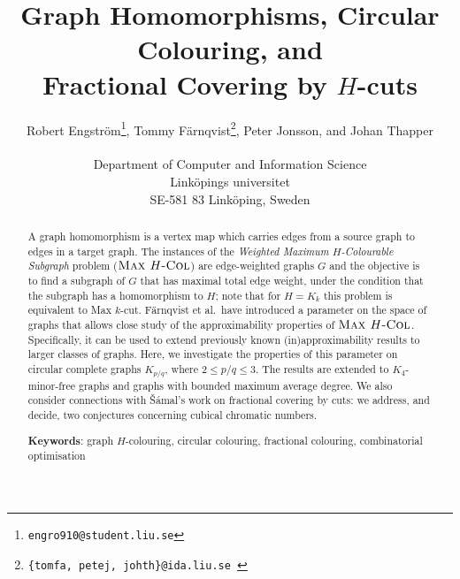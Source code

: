 \documentclass[11pt,a4paper]{article}
\begin{document}
\newcommand{\props}{{\it props}}
\newcommand{\rels}{{\it rels}}
\newcommand{\deduce}{\vdash_p}

\newcommand{\pform}{{\rm Pr}}
\newcommand{\axform}{{\rm AX}}
\newcommand{\axset}{{\bf AX}}
\newcommand{\resdeduce}{\vdash_{\rm R}}
\newcommand{\resaxdeduce}{\vdash_{\rm R,A}}

\newcommand{\cmis}{{\em \#mis}}
\newcommand{\combine}{{\em comb}}

\newcommand{\xcsp}{{\sc X-Csp}}
\newcommand{\csp}{{\sc Csp}}

\newcommand{\cc}[1]{\textnormal{\textbf{#1}}} \newcommand{\opt}[0]{\textrm{{\sc opt}}}


\newcommand{\MC}{mc}
\newcommand{\Ha}{\textrm{\textit{H\aa}}}
\renewcommand{\atop}[2]{\genfrac{}{}{0pt}{}{#1}{#2}}
\newcommand{\GHAT}{{\cal G_\equiv}}
\newcommand{\HOMEQ}{\equiv}

\pagestyle{plain}

\author{Robert Engstr\"om\footnote{\tt{engro910@student.liu.se}}, Tommy F\"arnqvist\footnote{\tt{\{tomfa, petej, johth\}@ida.liu.se }}, Peter Jonsson\footnotemark[2],  and Johan Thapper\footnotemark[2]\\
\\
\small
Department of Computer and Information Science\\
\small
Link\"{o}pings universitet\\
\small
SE-581 83 Link\"{o}ping, Sweden\\}


\title{Graph Homomorphisms, Circular Colouring, and \\ Fractional Covering by $H$-cuts}

\date{}
\maketitle

   

\begin{abstract}
A graph homomorphism is a vertex map which carries edges from a source 
graph to edges in a
target graph. The instances of the \emph{Weighted Maximum 
$H$-Colourable Subgraph} problem ($\mbox{\sc Max $H$-Col}$) are
edge-weighted graphs $G$ and
the objective is to find a subgraph of $G$ that has maximal total edge
weight, under 
the condition that the subgraph has a homomorphism to $H$; note that for
$H=K_k$ this 
problem is equivalent to {\sc Max $k$-cut}. F\"arnqvist et al.\ have
introduced a parameter on the space of graphs that allows close study of
the approximability properties of $\mbox{\sc Max $H$-Col}$. Specifically, it can be
used to extend previously known (in)approximability results to larger
classes of graphs. Here, we investigate the properties of this parameter
on circular complete graphs $K_{p/q}$, where $2 \leq p/q \leq 3$. The
results are extended to $K_4$-minor-free graphs and graphs with bounded
maximum average degree. We also consider connections with
\v{S}\'{a}mal's work on fractional covering by cuts: we address,
and decide, two conjectures concerning cubical chromatic numbers.

\noindent
{\bf Keywords}: graph $H$-colouring, circular colouring, fractional
colouring, combinatorial optimisation
\end{abstract}
\end{document}
